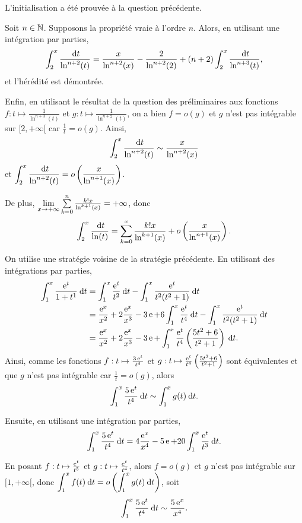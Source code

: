 \documentclass[oneside,11pt]{book}
\begin{document}
\begin{solution*}
L'initialisation a été prouvée à la question précédente.

Soit $n \in \mathbb{N}$. Supposons la propriété vraie à l'ordre $n$. Alors, en utilisant une intégration par parties,
\[
\displaystyle \int_2^x \frac{\:{\text d}t}{\ln^{n+2}(t)} = \frac{x}{\ln^{n+2}(x)} - \frac{2}{\ln^{n+2}(2)} + (n + 2) \displaystyle \int_2^x \frac{\:{\text d}t}{\ln^{n+3}(t)},
\]
et l'hérédité est démontrée.

Enfin, en utilisant le résultat de la question  des préliminaires aux fonctions $f : t \mapsto \frac{1}{\ln^{n+3}(t)}$ et $g : t \mapsto \frac{1}{\ln^{n+2}(t)}$, on a bien $f = o(g)$ et $g$ n'est pas intégrable sur $[2,+\infty[$ car $\frac{1}{t} = o(g)$. Ainsi,
\[
\displaystyle \int_2^x \frac{\:{\text d}t}{\ln^{n+2}(t)} \sim \frac{x}{\ln^{n+2}(x)}
\]
et $\displaystyle \int_2^x \frac{\:{\text d}t}{\ln^{n+2}(t)} = o\left(\frac{x}{\ln^{n+1}(x)}\right)$.

De plus, $\lim\limits_{x\to+\infty} \sum\limits_{k=0}^n \frac{k! x}{\ln^{k+1}(x)} = +\infty$, donc
\[
\displaystyle \int_2^x \frac{\:{\text d}t}{\ln(t)} = \sum\limits_{k=0}^x \frac{k! x}{\ln^{k+1}(x)} + o\left(\frac{x}{\ln^{n+1}(x)}\right).
\]

\squ On utilise une stratégie voisine de la stratégie précédente. En utilisant des intégrations par parties,
\begin{align*}
\displaystyle \int_1^x \frac{\operatorname{e}^t}{1 + t^1} \:{\text d}t &= \displaystyle \int_1^x \frac{\operatorname{e}^t}{t^2} \:{\text d}t - \displaystyle \int_1^x \frac{\operatorname{e}^t}{t^2 (t^2 + 1)} \:{\text d}t \\
&= \frac{\operatorname{e}^x}{x^2} + 2 \frac{\operatorname{e}^x}{x^3} - 3 \operatorname{e} + 6 \displaystyle \int_1^x \frac{\operatorname{e}^t}{t^4} \:{\text d}t - \displaystyle \int_1^x \frac{\operatorname{e}^t}{t^2 (t^2 + 1)} \:{\text d}t \\
&= \frac{\operatorname{e}^x}{x^2} + 2 \frac{\operatorname{e}^x}{x^3} - 3 \operatorname{e} + \displaystyle \int_1^x \frac{\operatorname{e}^t}{t^4} \left(\frac{5 t^2 + 6}{t^2 + 1}\right) \:{\text d}t.
\end{align*}
Ainsi, comme les fonctions $f : t \mapsto \frac{3 \operatorname{e}^t}{t^4}$ et $g : t \mapsto \frac{\operatorname{e}^t}{t^4} \left(\frac{5 t^2 + 6}{t^2 + 1}\right)$ sont équivalentes et que $g$ n'est pas intégrable car $\frac{1}{t} = o(g)$, alors
\[
\displaystyle \int_1^x \frac{5 \operatorname{e}^t}{t^4} \:{\text d}t \sim \displaystyle \int_1^x g(t) \:{\text d}t.
\]

Ensuite, en utilisant une intégration par parties,
\[
\displaystyle \int_1^x \frac{5 \operatorname{e}^t}{t^4} \:{\text d}t = 4 \frac{\operatorname{e}^x}{x^4} - 5 \operatorname{e} + 20 \displaystyle \int_1^x \frac{\operatorname{e}^t}{t^3} \:{\text d}t.
\]

En posant $f : t \mapsto \frac{\operatorname{e}^t}{t^5}$ et $g : t \mapsto \frac{\operatorname{e}^t}{t^4}$, alors $f = o(g)$ et $g$ n'est pas intégrable sur $[1, +\infty[$, donc $\displaystyle \int_1^x f(t) \:{\text d}t = o\left(\displaystyle \int_1^x g(t) \:{\text d}t\right)$, soit
\[
\displaystyle \int_1^x \frac{5 \operatorname{e}^t}{t^4} \:{\text d}t \sim \frac{5 \operatorname{e}^x}{x^4}.
\]


\end{solution*}
\end{document}
